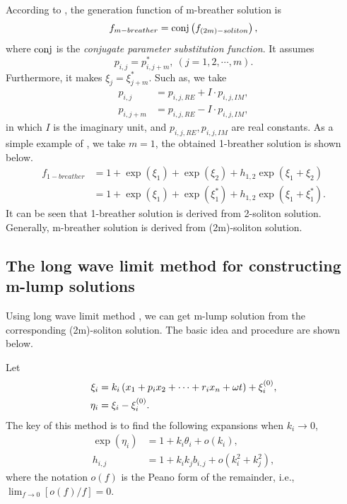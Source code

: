 According to \cite{tajiri1989breather}, the generation function of m-breather solution is
\begin{equation}
    f_{m-breather}={\rm conj}\left(f_{(2m)-soliton}\right), \label{f-breather}
\end{equation}
where ${\rm conj}$ is the \emph{conjugate parameter substitution function}. It assumes 
\begin{equation}
    p_{i,j}=p_{i,j+m}^*,~(j=1,2,\cdots,m).
\end{equation}
Furthermore, it makes $\xi_{j}=\xi_{j+m}^*$. Such as, we take
\begin{equation}
\begin{split}
    p_{i,j}&=p_{i,j,RE}+I\cdot p_{i,j,IM}, \\ 
    p_{i,j+m}&=p_{i,j,RE}-I\cdot p_{i,j,IM},
\end{split}
\end{equation}
in which $I$ is the imaginary unit, and $p_{i,j,RE},p_{i,j,IM}$ are real constants. As a simple example of , we take $m=1$, the obtained 1-breather solution is shown below.
\begin{equation}
\begin{split}
f_{1-breather}&=1+\exp(\xi_1)+\exp(\xi_2)+h_{1,2}\exp(\xi_1+\xi_2) \\ 
&=1+\exp(\xi_1)+\exp(\xi_1^*)+h_{1,2}\exp(\xi_1+\xi_1^*).
\end{split}
\end{equation}
It can be seen that 1-breather solution is derived from 2-soliton solution. Generally, m-breather solution is derived from (2m)-soliton solution.

\subsection{The long wave limit method for constructing m-lump solutions}
Using long wave limit method \cite{satsuma1979two}, we can get m-lump solution from the corresponding (2m)-soliton solution. The basic idea and procedure are shown below.

Let 
\begin{equation}
\begin{split}
    \xi_i&=k_i\left(x_1+p_ix_2+\cdots+r_ix_n+\omega t\right)+\xi_i^{(0)},\\
    \eta_i&=\xi_i-\xi_i^{(0)}.
\end{split}
\end{equation}
The key of this method is to find the following expansions when $k_i\rightarrow 0$,
\begin{equation}
\begin{split}
    \exp(\eta_i)&=1+k_i \theta_i+o(k_i), \\ 
    h_{i,j}&=1+k_ik_jb_{i,j}+o(k_i^2+k_j^2),
\end{split} \label{lump-expansion}
\end{equation}
where the notation $o(f)$ is the Peano form of the remainder, i.e., $\lim_{f\rightarrow 0}[o(f)/f]=0$.

